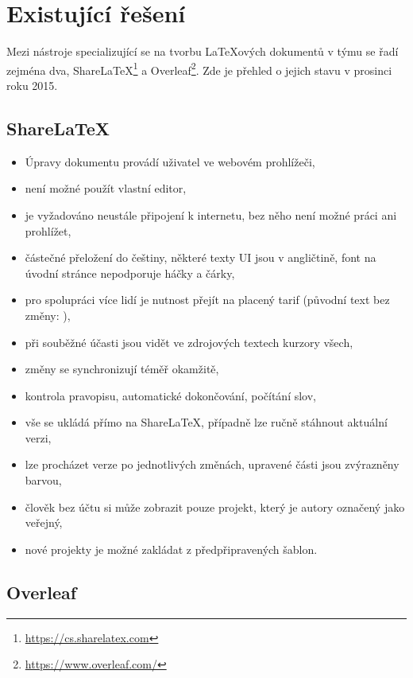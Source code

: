 \section{Existující řešení}

Mezi nástroje specializující se na tvorbu \LaTeX{ových} dokumentů v týmu se řadí zejména dva, ShareLaTeX\footnote{\url{https://cs.sharelatex.com}} a Overleaf\footnote{\url{https://www.overleaf.com/}}. Zde je přehled o jejich stavu v prosinci roku 2015.

\subsection{ShareLaTeX}

\begin{itemize}
	\item Úpravy dokumentu provádí uživatel ve webovém prohlížeči,
	\item není možné použít vlastní editor,
	\item je vyžadováno neustále připojení k internetu, bez něho není možné práci ani prohlížet,
	\item částečné přeložení do češtiny, některé texty UI jsou v angličtině, font na úvodní stránce nepodporuje háčky a čárky,
	\item pro spolupráci více lidí je nutnost přejít na placený tarif (původní text bez změny:  \cite{sharelatex-pricing}),
	\item při souběžné účasti jsou vidět ve zdrojových textech kurzory všech,
	\item změny se synchronizují téměř okamžitě,
	\item kontrola pravopisu, automatické dokončování, počítání slov,
	\item vše se ukládá přímo na ShareLaTeX, případně lze ručně stáhnout aktuální verzi,
	\item lze procházet verze po jednotlivých změnách, upravené části jsou zvýrazněny barvou,
	\item člověk bez účtu si může zobrazit pouze projekt, který je autory označený jako veřejný,
	\item nové projekty je možné zakládat z předpřipravených šablon.
\end{itemize}


\subsection{Overleaf}

